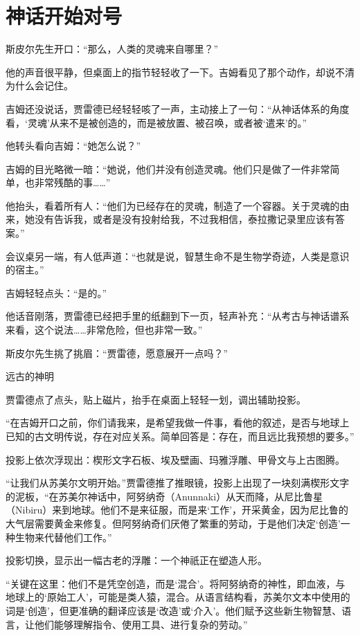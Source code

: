 \chapter{神话开始对号}

斯皮尔先生开口：“那么，人类的灵魂来自哪里？”

他的声音很平静，但桌面上的指节轻轻收了一下。吉姆看见了那个动作，却说不清为什么会记住。

吉姆还没说话，贾雷德已经轻轻咳了一声，主动接上了一句：“从神话体系的角度看，‘灵魂’从来不是被创造的，而是被放置、被召唤，或者被‘遣来’的。”

他转头看向吉姆：“她怎么说？”

吉姆的目光略微一暗：“她说，他们并没有创造灵魂。他们只是做了一件非常简单，也非常残酷的事……”

他抬头，看着所有人：“他们为已经存在的灵魂，制造了一个容器。关于灵魂的由来，她没有告诉我，或者是没有投射给我，不过我相信，泰拉撒记录里应该有答案。”

会议桌另一端，有人低声道：“也就是说，智慧生命不是生物学奇迹，人类是意识的宿主。”

吉姆轻轻点头：“是的。”

他话音刚落，贾雷德已经把手里的纸翻到下一页，轻声补充：“从考古与神话谱系来看，这个说法……非常危险，但也非常一致。”

斯皮尔先生挑了挑眉：“贾雷德，愿意展开一点吗？”

远古的神明

贾雷德点了点头，贴上磁片，抬手在桌面上轻轻一划，调出辅助投影。

“在吉姆开口之前，你们请我来，是希望我做一件事，看他的叙述，是否与地球上已知的古文明传说，存在对应关系。简单回答是：存在，而且远比我预想的要多。”

投影上依次浮现出：楔形文字石板、埃及壁画、玛雅浮雕、甲骨文与上古图腾。

“让我们从苏美尔文明开始。”贾雷德推了推眼镜，投影上出现了一块刻满楔形文字的泥板，“在苏美尔神话中，阿努纳奇（Anunnaki）从天而降，从尼比鲁星（Nibiru）来到地球。他们不是来征服，而是来‘工作’，开采黄金，因为尼比鲁的大气层需要黄金来修复。但阿努纳奇们厌倦了繁重的劳动，于是他们决定‘创造’一种生物来代替他们工作。”

投影切换，显示出一幅古老的浮雕：一个神祇正在塑造人形。

“关键在这里：他们不是凭空创造，而是‘混合’。将阿努纳奇的神性，即血液，与地球上的‘原始工人’，可能是类人猿，混合。从语言结构看，苏美尔文本中使用的词是‘创造’，但更准确的翻译应该是‘改造’或‘介入’。他们赋予这些新生物智慧、语言，让他们能够理解指令、使用工具、进行复杂的劳动。”

